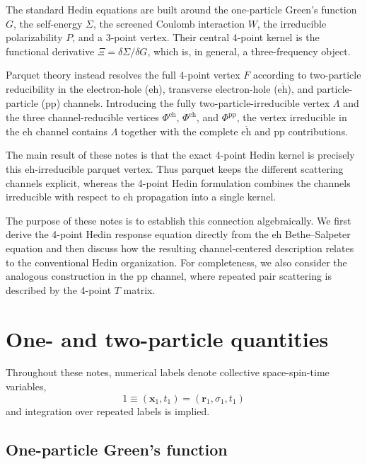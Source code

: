 \documentclass[aip,jcp,reprint,noshowkeys,superscriptaddress]{revtex4-1}
\newcommand{\br}{\boldsymbol{r}}
\newcommand{\bx}{\boldsymbol{x}}
\newcommand{\eh}{\text{eh}}
\newcommand{\teh}{\overline{\text{eh}}}
\newcommand{\pp}{\text{pp}}
\begin{document}
The standard Hedin equations are built around the one-particle Green's
function $G$, the self-energy $\Sigma$, the screened Coulomb interaction
$W$, the irreducible polarizability $P$, and a 3-point vertex.\cite{Hedin1965,MarieAmmarLoos2024}
Their central 4-point kernel is the functional derivative
$\Xi=\delta\Sigma/\delta G$, which is, in general, a three-frequency
object.

Parquet theory instead resolves the full 4-point vertex $F$ according to
two-particle reducibility in the electron-hole ($\eh$), transverse
electron-hole ($\teh$), and particle-particle ($\pp$) channels.\cite{DeDominicis_1964b,Eckhardt2023,MarieLoos2025}
Introducing the fully two-particle-irreducible vertex $\Lambda$ and the
three channel-reducible vertices $\Phi^\eh$, $\Phi^{\teh}$, and
$\Phi^\pp$, the vertex irreducible in the $\eh$ channel contains
$\Lambda$ together with the complete $\teh$ and $\pp$ contributions.

The main result of these notes is that the exact 4-point Hedin kernel is
precisely this $\eh$-irreducible parquet vertex.
Thus parquet keeps the different scattering channels explicit, whereas
the 4-point Hedin formulation combines the channels irreducible with
respect to $\eh$ propagation into a single kernel.

The purpose of these notes is to establish this connection algebraically.
We first derive the 4-point Hedin response equation directly from the
$\eh$ Bethe--Salpeter equation and then discuss how the resulting
channel-centered description relates to the conventional Hedin
organization.
For completeness, we also consider the analogous construction in the
$\pp$ channel, where repeated pair scattering is described by the
4-point $T$ matrix.

\section{One- and two-particle quantities}
\label{sec:quantities}

Throughout these notes, numerical labels denote collective
space-spin-time variables,
\begin{equation}
	1 \equiv (\bx_1,t_1)
	= (\br_1,\sigma_1,t_1)
\end{equation}
and integration over repeated labels is implied.

\subsection{One-particle Green's function}
\end{document}
